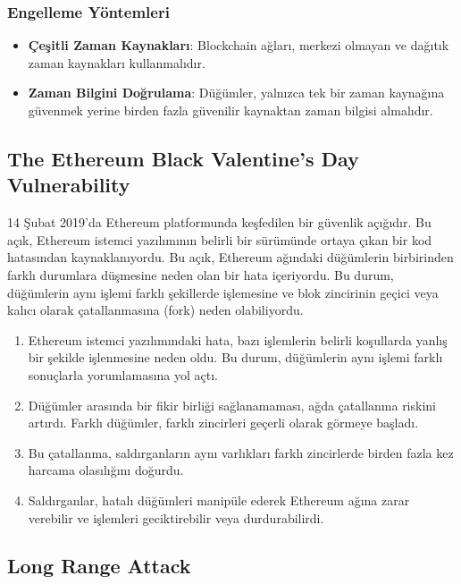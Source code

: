 \subsubsection{Engelleme Yöntemleri}

\begin{itemize}
    \item \textbf{Çeşitli Zaman Kaynakları}: Blockchain ağları, merkezi olmayan ve dağıtık zaman kaynakları kullanmalıdır.
    \item \textbf{Zaman Bilgini Doğrulama}: Düğümler, yalnızca tek bir zaman kaynağına güvenmek yerine birden fazla güvenilir kaynaktan zaman bilgisi almalıdır.
\end{itemize}

\newpage

\subsection{The Ethereum Black Valentine's Day Vulnerability}

14 Şubat 2019'da Ethereum platformunda keşfedilen bir güvenlik açığıdır. Bu açık, Ethereum istemci yazılımının belirli bir sürümünde ortaya çıkan bir kod hatasından kaynaklanıyordu. Bu açık, Ethereum ağındaki düğümlerin birbirinden farklı durumlara düşmesine neden olan bir hata içeriyordu. Bu durum, düğümlerin aynı işlemi farklı şekillerde işlemesine ve blok zincirinin geçici veya kalıcı olarak çatallanmasına (fork) neden olabiliyordu.

\begin{enumerate}
    \item Ethereum istemci yazılımındaki hata, bazı işlemlerin belirli koşullarda yanlış bir şekilde işlenmesine neden oldu. Bu durum, düğümlerin aynı işlemi farklı sonuçlarla yorumlamasına yol açtı.
    \item Düğümler arasında bir fikir birliği sağlanamaması, ağda çatallanma riskini artırdı. Farklı düğümler, farklı zincirleri geçerli olarak görmeye başladı.
    \item Bu çatallanma, saldırganların aynı varlıkları farklı zincirlerde birden fazla kez harcama olasılığını doğurdu.
    \item Saldırganlar, hatalı düğümleri manipüle ederek Ethereum ağına zarar verebilir ve işlemleri geciktirebilir veya durdurabilirdi.
\end{enumerate}

\newpage

\subsection{Long Range Attack}

